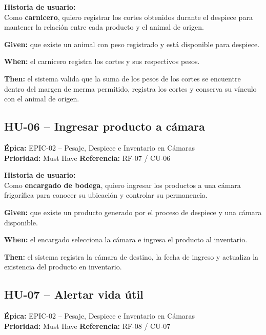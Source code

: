 \documentclass[11pt,a4paper]{article}
\begin{document}
\medskip
\textbf{Historia de usuario:}\\
Como \textbf{carnicero}, quiero registrar los cortes obtenidos durante el despiece para
mantener la relación entre cada producto y el animal de origen.

\begin{tcolorbox}[colback=lightblue,colframe=uteqblue,title=\textbf{BDD -- Criterio de aceptación}]
\textbf{Given:} que existe un animal con peso registrado y está disponible para despiece.

\medskip
\textbf{When:} el carnicero registra los cortes y sus respectivos pesos.

\medskip
\textbf{Then:} el sistema valida que la suma de los pesos de los cortes se encuentre dentro
del margen de merma permitido, registra los cortes y conserva su vínculo con el animal de origen.
\end{tcolorbox}

\subsection{HU-06 -- Ingresar producto a cámara}
\textbf{Épica:} EPIC-02 -- Pesaje, Despiece e Inventario en Cámaras\\
\textbf{Prioridad:} Must Have \quad \textbf{Referencia:} RF-07 / CU-06

\medskip
\textbf{Historia de usuario:}\\
Como \textbf{encargado de bodega}, quiero ingresar los productos a una cámara frigorífica
para conocer su ubicación y controlar su permanencia.

\begin{tcolorbox}[colback=lightblue,colframe=uteqblue,title=\textbf{BDD -- Criterio de aceptación}]
\textbf{Given:} que existe un producto generado por el proceso de despiece y una cámara disponible.

\medskip
\textbf{When:} el encargado selecciona la cámara e ingresa el producto al inventario.

\medskip
\textbf{Then:} el sistema registra la cámara de destino, la fecha de ingreso y actualiza
la existencia del producto en inventario.
\end{tcolorbox}

\subsection{HU-07 -- Alertar vida útil}
\textbf{Épica:} EPIC-02 -- Pesaje, Despiece e Inventario en Cámaras\\
\textbf{Prioridad:} Must Have \quad \textbf{Referencia:} RF-08 / CU-07
\end{document}
